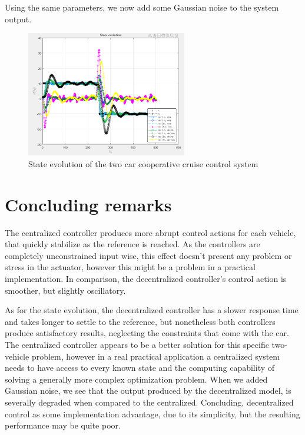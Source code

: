\documentclass[a4paper,twocolumn]{article}
\begin{document}
Using the same parameters, we now add some Gaussian noise to the system output.
 \begin{figure}[!ht]
 	\centering
 	\includegraphics[width=7cm]{cen_dec_unc_out_noise.png}
 	\caption{State evolution of the two car cooperative cruise control system}
 	\label{fig:output_noise}
 \end{figure}
\section{Concluding remarks}

The centralized controller produces more abrupt control actions for each vehicle, that quickly stabilize as the reference is reached. As the controllers are completely unconstrained input wise, this effect doesn't present any problem or stress in the actuator, however this might be a problem in a practical implementation. In comparison, the decentralized controller's control action is smoother, but slightly oscillatory.

As for the state evolution, the decentralized controller has a slower response time and takes longer to settle to the reference, but nonetheless both controllers produce satisfactory results, neglecting the constraints that come with the car. The centralized controller appears to be a better solution for this specific two-vehicle problem, however in a real practical application a centralized system needs to have access to every known state and the computing capability of solving a generally more complex optimization problem.
When we added Gaussian noise, we see that the output produced by the decentralized model, is severally degraded when compared to the centralized. 
Concluding, decentralized control as some implementation advantage, due to its simplicity, but the resulting performance may be quite poor. \cite{Ding2012}

\nocite{*}

%

	
\end{document}
